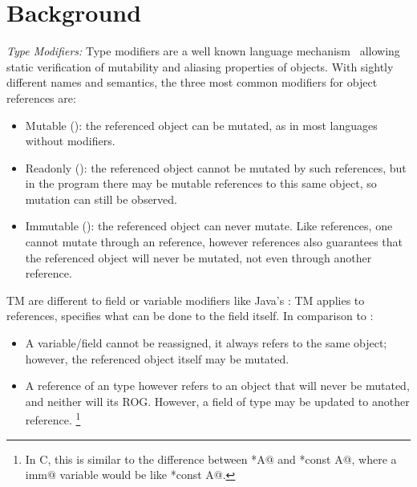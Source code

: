 

\section{Background}
\label{s:background}
\noindent\textit{Type Modifiers:}
Type modifiers are a well known language mechanism~\cite{TschantzErnst05,BirkaErnst04,OstlundEtAl08,clebsch2015deny,GianniniEtAl16,GordonEtAl12} allowing static verification of mutability and aliasing properties of objects.
With sightly different names and semantics, the three most common modifiers for object references are:
\begin{itemize}
\item Mutable (\Q@mut@): the referenced object can be mutated, as in most languages without modifiers.
\item Readonly (\Q@read@): the referenced object cannot be mutated by such references, but in the program there may be mutable references to this same object, so mutation can still be observed. 
\item Immutable (\Q@imm@): the referenced object can never mutate. Like \Q@read@ references, one cannot mutate through an \Q@imm@ reference, however \Q@imm@ references also guarantees that the referenced object will never be mutated, not even through another reference.
\end{itemize}
TM are different to field or variable modifiers like Java’s \Q@final@: TM applies to references,  \Q@final@ specifies what can be done to the field itself. In comparison to \Q@imm@:

\begin{itemize}
\item A \Q@final@ variable/field cannot be reassigned, it always refers to the same object; however, the referenced object itself may be mutated.
\item A reference of an \Q@imm@ type however refers to an object that will never be mutated, and neither will its ROG. However, a field of type \Q@imm@ may be updated to another \Q@imm@ reference.
\footnote{In C, this is similar to the difference between \Q@const *A@ and \Q@*const A@, where a \Q@final imm@ variable would be like \Q@const *const A@.}
\end{itemize}



